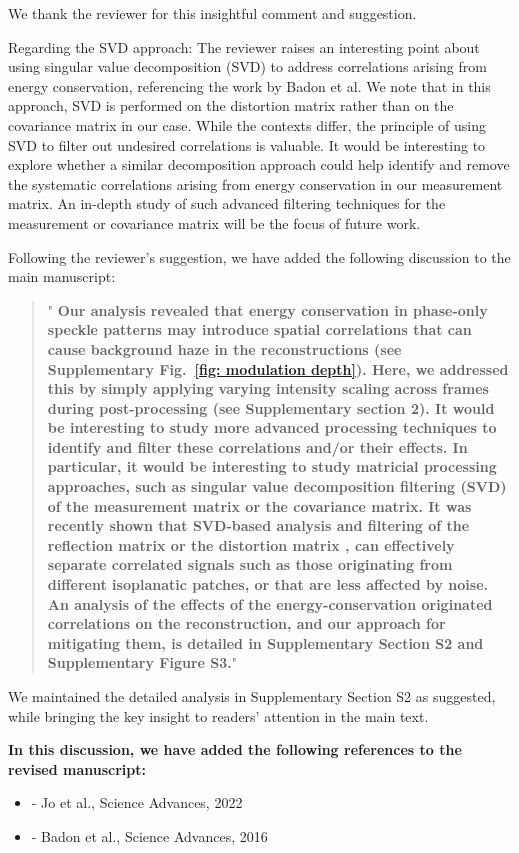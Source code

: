 \documentclass[12pt]{article}
\newenvironment{finished_ourresponse}
    {\begin{tcolorbox}[width=\linewidth,breakable,enhanced,colback=gray!5,colframe=finished_responsecolor!50,title=Response,left=5pt,right=5pt]}
    {\end{tcolorbox}}
\begin{document}
\begin{finished_ourresponse}
    
We thank the reviewer for this insightful comment and suggestion.

Regarding the SVD approach: The reviewer raises an interesting point about using singular value decomposition (SVD) to address correlations arising from energy conservation, referencing the work by Badon et al.\cite{badon2020distortion} We note that in this approach, SVD is performed on the distortion matrix rather than on the covariance matrix in our case. While the contexts differ, the principle of using SVD to filter out undesired correlations is valuable. It would be interesting to explore whether a similar decomposition approach could help identify and remove the systematic correlations arising from energy conservation in our measurement matrix. An in-depth study of such advanced filtering techniques for the measurement or covariance matrix will be the focus of future work.

Following the reviewer's suggestion, we have added the following discussion to the main manuscript: 
\begin{quote}
    "{\bfseries
    Our analysis revealed that energy conservation in phase-only speckle patterns may introduce spatial correlations that can cause background haze in the reconstructions (see Supplementary Fig.~\ref{fig: modulation depth}). Here, we addressed this by simply applying varying intensity scaling across frames during post-processing (see Supplementary section 2). It would be interesting to study more advanced processing techniques to identify and filter these correlations and/or their effects. In particular, it would be interesting to study matricial processing approaches, such as singular value decomposition filtering (SVD) of the measurement matrix or the covariance matrix. It was recently shown that SVD-based analysis and filtering of the reflection matrix or the distortion matrix \cite{jo2022through, badon2016smart, badon2020distortion},  can effectively separate correlated signals such as those originating from different isoplanatic patches, or that are less affected by noise. 
    An analysis of the effects of the energy-conservation originated correlations on the reconstruction, and our approach for mitigating them, is detailed in Supplementary Section S2 and Supplementary Figure S3.}"
\end{quote}
We maintained the detailed analysis in Supplementary Section S2 as suggested, while bringing the key insight to readers' attention in the main text.

\textbf{In this discussion, we have added the following references to the revised manuscript:}
\begin{itemize}[nosep]
\item \cite{jo2022through} - Jo et al., Science Advances, 2022
\item \cite{badon2016smart} - Badon et al., Science Advances, 2016
\end{itemize}

\end{finished_ourresponse}
\end{document}
